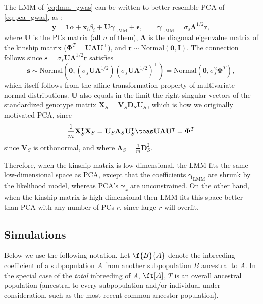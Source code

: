 \documentclass[11pt]{article}
\begin{document}
The LMM of \cref{eq:lmm_gwas} can be written to better resemble PCA of \cref{eq:pca_gwas}, as \citep{astle_population_2009, hoffman_correcting_2013}:
\begin{equation}
  \label{eq:lmm_gwas_evd}
  \mathbf{y}
  =
  \mathbf{1} \alpha + \mathbf{x}_i \beta_i + \mathbf{U} \boldsymbol{\gamma}_\text{LMM} + \boldsymbol{\epsilon}
  , \quad\quad
  \boldsymbol{\gamma}_\text{LMM} = \sigma_s \boldsymbol{\Lambda}^{1/2} \mathbf{r}
  ,
\end{equation}
where $\mathbf{U}$ is the PCs matrix (all $n$ of them), $\boldsymbol{\Lambda}$ is the diagonal eigenvalue matrix of the kinship matrix ($\mathbf{\Phi}^T = \mathbf{U} \boldsymbol{\Lambda} \mathbf{U}^\intercal$), and $\mathbf{r} \sim \text{Normal}(\mathbf{0},\mathbf{I})$.
The connection follows since $\mathbf{s} = \sigma_s \mathbf{U} \boldsymbol{\Lambda}^{1/2} \mathbf{r}$ satisfies
$$
\mathbf{s} \sim \text{Normal} \left( \mathbf{0}, \left( \sigma_s \mathbf{U} \boldsymbol{\Lambda}^{1/2} \right) \left( \sigma_s \mathbf{U} \boldsymbol{\Lambda}^{1/2} \right)^\intercal \right)
= \text{Normal}( \mathbf{0}, \sigma_s^2 \mathbf{\Phi}^T ),
$$
which itself follows from the affine transformation property of multivariate normal distributions.
$\mathbf{U}$ also equals in the limit the right singular vectors of the standardized genotype matrix $\mathbf{X}_S = \mathbf{V}_S \mathbf{D}_S \mathbf{U}_S^\intercal$, which is how we originally motivated PCA, since
$$
\frac{1}{m} \mathbf{X}_S^\intercal \mathbf{X}_S
= \mathbf{U}_S \mathbf{\Lambda}_S \mathbf{U}_S^\intercal
\toas
\mathbf{U} \mathbf{\Lambda} \mathbf{U}^\intercal
=
\mathbf{\Phi}^T
$$
since $\mathbf{V}_S$ is orthonormal, and where $\mathbf{\Lambda}_S = \frac{1}{m} \mathbf{D}_S^2$.

Therefore, when the kinship matrix is low-dimensional, the LMM fits the same low-dimensional space as PCA, except that the coefficients $\boldsymbol{\gamma}_\text{LMM}$ are shrunk by the likelihood model, whereas PCA's $\boldsymbol{\gamma}_r$ are unconstrained.
On the other hand, when the kinship matrix is high-dimensional then LMM fits this space better than PCA with any number of PCs $r$, since large $r$ will overfit.

\subsection{Simulations}

Below we use the following notation.
Let $\f{B}{A}$ denote the inbreeding coefficient of a subpopulation $A$ from another subpopulation $B$ ancestral to $A$.
In the special case of the \textit{total} inbreeding of $A$, $\ft[A]$, $T$ is an overall ancestral population (ancestral to every subpopulation and/or individual under consideration, such as the most recent common ancestor population).
\end{document}
